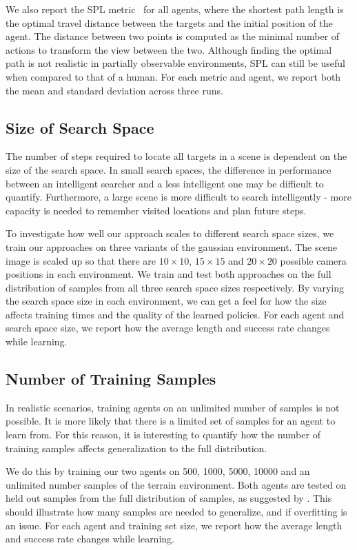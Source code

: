 We also report the SPL metric~\cite{anderson_evaluation_2018} for all agents, where the shortest path length is the optimal travel distance between the targets and the initial position of the agent.
The distance between two points is computed as the minimal number of actions to transform the view between the two.
Although finding the optimal path is not realistic in partially observable environments, SPL can still be useful when compared to that of a human.
For each metric and agent, we report both the mean and standard deviation across three runs.

\subsection{Size of Search Space}

The number of steps required to locate all targets in a scene is dependent on the size of the search space.
In small search spaces, the difference in performance between an intelligent searcher and a less intelligent one may be difficult to quantify.
Furthermore, a large scene is more difficult to search intelligently - more capacity is needed to remember visited locations and plan future steps.

To investigate how well our approach scales to different search space sizes, we train our approaches on three variants of the gaussian environment.
The scene image is scaled up so that there are \(10 \times 10\), \(15 \times 15\) and \(20 \times 20\) possible camera positions in each environment.
We train and test both approaches on the full distribution of samples from all three search space sizes respectively.
By varying the search space size in each environment, we can get a feel for how the size affects training times and the quality of the learned policies.
For each agent and search space size, we report how the average length and success rate changes while learning.

\subsection{Number of Training Samples}

In realistic scenarios, training agents on an unlimited number of samples is not possible.
It is more likely that there is a limited set of samples for an agent to learn from.
For this reason, it is interesting to quantify how the number of training samples affects generalization to the full distribution.

We do this by training our two agents on 500, 1000, 5000, 10000 and an unlimited number samples of the terrain environment.
Both agents are tested on held out samples from the full distribution of samples, as suggested by \cite{cobbe_leveraging_2020}.
This should illustrate how many samples are needed to generalize, and if overfitting is an issue.
For each agent and training set size, we report how the average length and success rate changes while learning.


